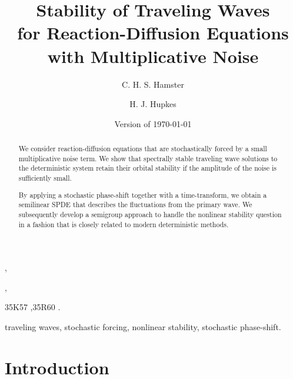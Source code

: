\documentclass[10pt]{articleHJ}
\newlength{\defbaselineskip}
\newcommand{\singlespacing}{\setlength{\baselineskip}{\defbaselineskip}}
\numberwithin{equation}{section}
\begin{document}
\begin{frontmatter}
\title{Stability of Traveling Waves \\ for Reaction-Diffusion Equations \\
  with Multiplicative Noise}

\author[LD1]{C. H. S. Hamster},
\author[LD2]{H. J. Hupkes},
\address[LD1]{
  Mathematisch Instituut - Universiteit Leiden \\
  P.O. Box 9512; 2300 RA Leiden; The Netherlands \\
  Email:  {}
}
\address[LD2]{
  Mathematisch Instituut - Universiteit Leiden \\
  P.O. Box 9512; 2300 RA Leiden; The Netherlands \\ Email:  {}
}

\date{Version of \today}

\begin{abstract}
\singlespacing
%
We consider reaction-diffusion equations
that are stochastically forced by a small multiplicative noise term.
We show that spectrally stable traveling wave solutions
to the deterministic system retain their orbital stability
if the amplitude of the noise is sufficiently small.


By applying a stochastic phase-shift
together with a time-transform, we obtain a
semilinear SPDE that describes the fluctuations from the
primary wave. We subsequently develop a semigroup approach to handle the
nonlinear stability
question in a fashion that is closely related to modern
deterministic methods.


%
\end{abstract}

\begin{subjclass}
\singlespacing
35K57 \sep 35R60 .
\end{subjclass}


\begin{keyword}
\singlespacing
traveling waves, stochastic forcing,
nonlinear stability, stochastic phase-shift.
\end{keyword}

\end{frontmatter}



\section{Introduction}
\label{sec:int}
\end{document}
